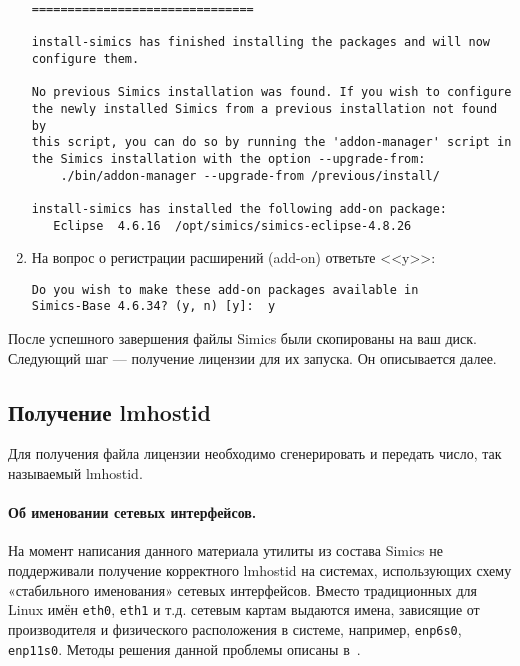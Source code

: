 \begin{enumerate}
\begin{lstlisting}
===============================

install-simics has finished installing the packages and will now
configure them.

No previous Simics installation was found. If you wish to configure
the newly installed Simics from a previous installation not found by
this script, you can do so by running the 'addon-manager' script in
the Simics installation with the option --upgrade-from:
    ./bin/addon-manager --upgrade-from /previous/install/

install-simics has installed the following add-on package:
   Eclipse  4.6.16  /opt/simics/simics-eclipse-4.8.26
\end{lstlisting}

\item На вопрос о регистрации расширений (\abbr add-on) ответьте <<y>>:
\begin{lstlisting}
Do you wish to make these add-on packages available in
Simics-Base 4.6.34? (y, n) [y]:  y
\end{lstlisting}   
\end{enumerate}

После успешного завершения файлы Simics были скопированы на ваш диск. Следующий шаг --- получение лицензии для их запуска. Он описывается далее.

\subsection{Получение lmhostid}

Для получения файла лицензии необходимо сгенерировать и передать число, так называемый lmhostid.

\paragraph{Об именовании сетевых интерфейсов.} На момент написания данного материала утилиты из состава Simics не поддерживали получение корректного lmhostid на системах, использующих схему «стабильного именования» сетевых интерфейсов. Вместо традиционных для Linux имён \texttt{eth0}, \texttt{eth1} и т.д. сетевым картам выдаются имена, зависящие от производителя и физического расположения в системе, например, \texttt{enp6s0}, \texttt{enp11s0}. 
Методы решения данной проблемы описаны в~\cite{predictable-iface-names}.

